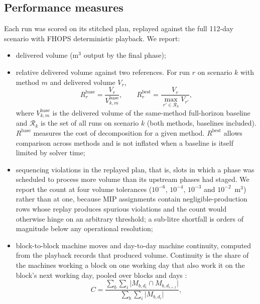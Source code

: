 \subsection{Performance measures}

Each run was scored on its stitched plan, replayed against the full 112-day scenario with FHOPS
deterministic playback. We report:
\begin{itemize}
  \item delivered volume (m$^3$ output by the final phase);
  \item relative delivered volume against two references. For run $r$ on scenario $k$ with
        method $m$ and delivered volume $V_r$,
        \begin{equation}
          R^{\mathrm{base}}_r = \frac{V_r}{V^{\mathrm{base}}_{k,m}}, \qquad
          R^{\mathrm{best}}_r = \frac{V_r}{\max_{r' \in \mathcal{R}_k} V_{r'}},
          \label{eq:relative}
        \end{equation}
        where $V^{\mathrm{base}}_{k,m}$ is the delivered volume of the same-method full-horizon
        baseline and $\mathcal{R}_k$ is the set of all runs on scenario $k$ (both methods,
        baselines included). $R^{\mathrm{base}}$ measures the cost of decomposition for a given
        method. $R^{\mathrm{best}}$ allows comparison across methods and is not inflated when a
        baseline is itself limited by solver time;
  \item sequencing violations in the replayed plan, that is, slots in which a phase was scheduled
        to process more volume than its upstream phases had staged. We report the count at four
        volume tolerances ($10^{-6}$, $10^{-4}$, $10^{-3}$ and $10^{-2}$~m$^3$) rather than at one,
        because MIP assignments contain negligible-production rows whose replay produces spurious
        violations and the count would otherwise hinge on an arbitrary threshold; a sub-litre
        shortfall is orders of magnitude below any operational resolution;
  \item block-to-block machine moves and day-to-day machine continuity, computed from the playback records
        that produced volume. Continuity is the share of the machines working a block on one
        working day that also work it on the block's next working day, pooled over blocks and days
        \citep[adapted from][]{vanhoucke2006work}:
        \begin{equation}
          C = \frac{\sum_{b}\sum_{i} \lvert M_{b,d_i} \cap M_{b,d_{i+1}} \rvert}
                   {\sum_{b}\sum_{i} \lvert M_{b,d_i} \rvert},

\end{equation}
\end{itemize}

